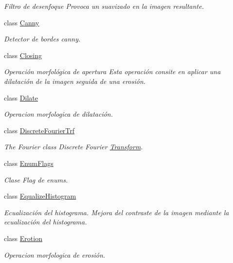 \begin{DoxyCompactItemize}
\begin{DoxyCompactList}\small\item\em Filtro de desenfoque Provoca un suavizado en la imagen resultante. \end{DoxyCompactList}\item 
class \hyperlink{class_i3_d_1_1_canny}{Canny}
\begin{DoxyCompactList}\small\item\em Detector de bordes canny. \end{DoxyCompactList}\item 
class \hyperlink{class_i3_d_1_1_closing}{Closing}
\begin{DoxyCompactList}\small\item\em Operación morfológica de apertura Esta operación consite en aplicar una dilatación de la imagen seguida de una erosión. \end{DoxyCompactList}\item 
class \hyperlink{class_i3_d_1_1_dilate}{Dilate}
\begin{DoxyCompactList}\small\item\em Operacion morfologica de dilatación. \end{DoxyCompactList}\item 
class \hyperlink{class_i3_d_1_1_discrete_fourier_trf}{Discrete\+Fourier\+Trf}
\begin{DoxyCompactList}\small\item\em The Fourier class Discrete Fourier \hyperlink{class_i3_d_1_1_transform}{Transform}. \end{DoxyCompactList}\item 
class \hyperlink{class_i3_d_1_1_enum_flags}{Enum\+Flags}
\begin{DoxyCompactList}\small\item\em Clase Flag de enums. \end{DoxyCompactList}\item 
class \hyperlink{class_i3_d_1_1_equalize_histogram}{Equalize\+Histogram}
\begin{DoxyCompactList}\small\item\em Ecualización del histograma. Mejora del contraste de la imagen mediante la ecualización del histograma. \end{DoxyCompactList}\item 
class \hyperlink{class_i3_d_1_1_erotion}{Erotion}
\begin{DoxyCompactList}\small\item\em Operacion morfologica de erosión. \end{DoxyCompactList}\item 

\end{DoxyCompactItemize}
